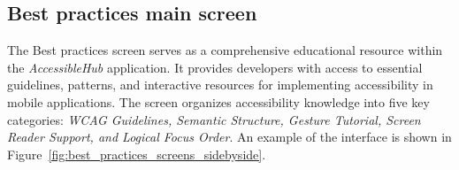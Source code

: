 \subsection{Best practices main screen}

The Best practices screen serves as a comprehensive educational resource within the \textit{AccessibleHub} application. It provides developers with access to essential guidelines, patterns, and interactive resources for implementing accessibility in mobile applications. The screen organizes accessibility knowledge into five key categories: \textit{WCAG Guidelines, Semantic Structure, Gesture Tutorial, Screen Reader Support, and Logical Focus Order}. An example of the interface is shown in Figure~\ref{fig:best_practices_screens_sidebyside}.

\begin{figure}[ht]
    \centering
    \begin{subfigure}[b]{0.48\textwidth}
        \centering

\end{subfigure}
\end{figure}

